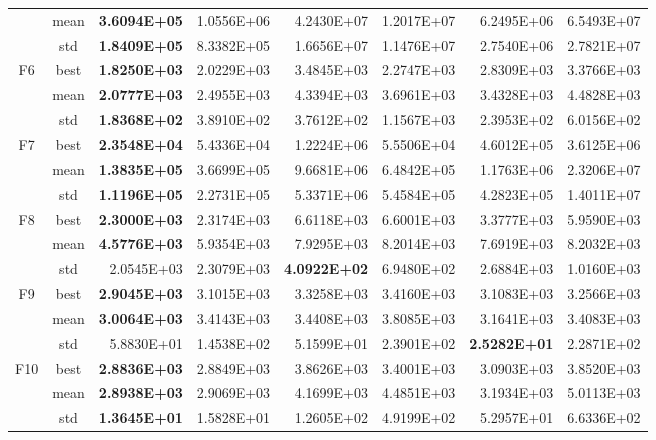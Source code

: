 \documentclass{wzuthesis}
\begin{document}
\begin{table}[htbp]
\begin{tabular}{ccrrrrrr}
          & mean  & \textbf{3.6094E+05} & 1.0556E+06 & 4.2430E+07 & 1.2017E+07 & 6.2495E+06 & 6.5493E+07 \\
          & std   & \textbf{1.8409E+05} & 8.3382E+05 & 1.6656E+07 & 1.1476E+07 & 2.7540E+06 & 2.7821E+07 \\
    \multirow{3}[0]{*}{F6} & best  & \textbf{1.8250E+03} & 2.0229E+03 & 3.4845E+03 & 2.2747E+03 & 2.8309E+03 & 3.3766E+03 \\
          & mean  & \textbf{2.0777E+03} & 2.4955E+03 & 4.3394E+03 & 3.6961E+03 & 3.4328E+03 & 4.4828E+03 \\
          & std   & \textbf{1.8368E+02} & 3.8910E+02 & 3.7612E+02 & 1.1567E+03 & 2.3953E+02 & 6.0156E+02 \\
    \multirow{3}[0]{*}{F7} & best  & \textbf{2.3548E+04} & 5.4336E+04 & 1.2224E+06 & 5.5506E+04 & 4.6012E+05 & 3.6125E+06 \\
          & mean  & \textbf{1.3835E+05} & 3.6699E+05 & 9.6681E+06 & 6.4842E+05 & 1.1763E+06 & 2.3206E+07 \\
          & std   & \textbf{1.1196E+05} & 2.2731E+05 & 5.3371E+06 & 5.4584E+05 & 4.2823E+05 & 1.4011E+07 \\
    \multirow{3}[0]{*}{F8} & best  & \textbf{2.3000E+03} & 2.3174E+03 & 6.6118E+03 & 6.6001E+03 & 3.3777E+03 & 5.9590E+03 \\
          & mean  & \textbf{4.5776E+03} & 5.9354E+03 & 7.9295E+03 & 8.2014E+03 & 7.6919E+03 & 8.2032E+03 \\
          & std   & 2.0545E+03 & 2.3079E+03 & \textbf{4.0922E+02} & 6.9480E+02 & 2.6884E+03 & 1.0160E+03 \\
    \multirow{3}[0]{*}{F9} & best  & \textbf{2.9045E+03} & 3.1015E+03 & 3.3258E+03 & 3.4160E+03 & 3.1083E+03 & 3.2566E+03 \\
          & mean  & \textbf{3.0064E+03} & 3.4143E+03 & 3.4408E+03 & 3.8085E+03 & 3.1641E+03 & 3.4083E+03 \\
          & std   & 5.8830E+01 & 1.4538E+02 & 5.1599E+01 & 2.3901E+02 & \textbf{2.5282E+01} & 2.2871E+02 \\
    \multirow{3}[0]{*}{F10} & best  & \textbf{2.8836E+03} & 2.8849E+03 & 3.8626E+03 & 3.4001E+03 & 3.0903E+03 & 3.8520E+03 \\
          & mean  & \textbf{2.8938E+03} & 2.9069E+03 & 4.1699E+03 & 4.4851E+03 & 3.1934E+03 & 5.0113E+03 \\
          & std   & \textbf{1.3645E+01} & 1.5828E+01 & 1.2605E+02 & 4.9199E+02 & 5.2957E+01 & 6.6336E+02 \\
          \bottomrule
    \end{tabular}%
\end{table}%
\end{document}
